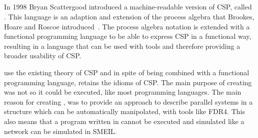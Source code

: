 
\subsection{\cspm{}}
In 1998 Bryan Scattergood introduced a machine-readable version of CSP, called \cspm. This language is an adaption and extension of the process algebra that Brookes, Hoare and Roscoe introduced~\cite{Brookes1984}. The process algebra notation is extended with a functional programming language to be able to express CSP in a functional way, resulting in a language that can be used with tools and therefore providing a broader usability of CSP.

\cspm{} use the existing theory of CSP and in spite of being combined with a functional programming language, \cspm{} retains the idioms of CSP.
The main purpose of creating \cspm{} was not so it could be executed, like most programming languages. The main reason for creating \cspm{}, was to provide an approach to describe parallel systems in a structure which can be automatically manipolated, with tools like FDR4. This also means that a program written in \cspm{} cannot be executed and simulated like a network can be simulated in SMEIL. \\

